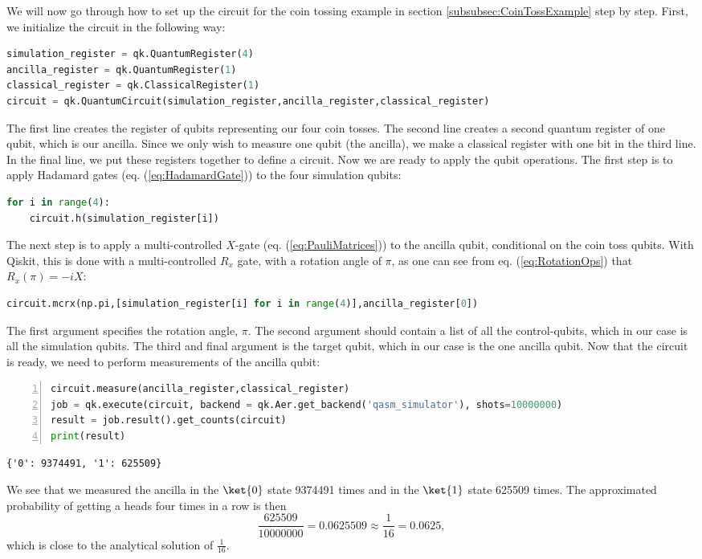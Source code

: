 We will now go through how to set up the circuit for the coin tossing example in section \ref{subsubsec:CoinTossExample} step by step. First, we initialize the circuit in the following way:
\begin{lstlisting}[language=Python,numbers=none]
simulation_register = qk.QuantumRegister(4)
ancilla_register = qk.QuantumRegister(1)
classical_register = qk.ClassicalRegister(1)
circuit = qk.QuantumCircuit(simulation_register,ancilla_register,classical_register)
\end{lstlisting}
The first line creates the register of qubits representing our four coin tosses. The second line creates a second quantum register of one qubit, which is our ancilla. Since we only wish to measure one qubit (the ancilla), we make a classical register with one bit in the third line.
In the final line, we put these registers together to define a circuit. Now we are ready to apply the qubit operations. The first step is to apply Hadamard gates (eq. (\ref{eq:HadamardGate})) to the four simulation qubits:
\begin{lstlisting}[language=Python,numbers=none]
for i in range(4):
    circuit.h(simulation_register[i])
\end{lstlisting}
The next step is to apply a multi-controlled $X$-gate (eq. (\ref{eq:PauliMatrices})) to the ancilla qubit, conditional on the coin toss qubits. With Qiskit, this is done with a multi-controlled $R_x$ gate, with a rotation angle of $\pi$, as one can see from eq. (\ref{eq:RotationOps}) that $R_x(\pi) = -iX$:
\begin{lstlisting}[language=Python,numbers=none]
circuit.mcrx(np.pi,[simulation_register[i] for i in range(4)],ancilla_register[0])
\end{lstlisting}
The first argument specifies the rotation angle, $\pi$. The second argument should contain a list of all the control-qubits, which in our case is all the simulation qubits. The third and final argument is the target qubit, which in our case is the one ancilla qubit.
Now that the circuit is ready, we need to perform measurements of the ancilla qubit:
\begin{lstlisting}[language=Python,numbers=left]
circuit.measure(ancilla_register,classical_register)
job = qk.execute(circuit, backend = qk.Aer.get_backend('qasm_simulator'), shots=10000000)
result = job.result().get_counts(circuit)
print(result)
\end{lstlisting}
\begin{verbatim}
{'0': 9374491, '1': 625509}
\end{verbatim}
We see that we measured the ancilla in the $\ket{0}$ state 9374491 times and in the $\ket{1}$ state 625509 times. The approximated probability of getting a heads four times in a row is then 
$$\frac{625509}{10000000} = 0.0625509 \approx \frac{1}{16} = 0.0625,$$
which is close to the analytical solution of $\frac{1}{16}$.

